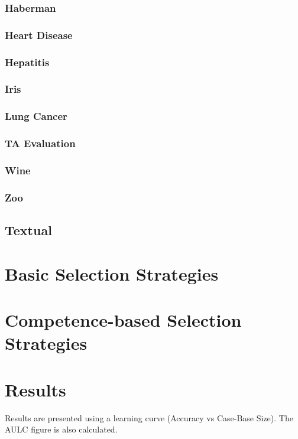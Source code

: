 \documentclass[a4paper,11pt]{report}
\begin{document}
\subsubsection*{Haberman}\label{sec:haberman}
\subsubsection*{Heart Disease}\label{sec:heart_disease}
\subsubsection*{Hepatitis}\label{sec:hepatitis}
\subsubsection*{Iris}\label{sec:iris}
\subsubsection*{Lung Cancer}\label{sec:lung_cancer}
\subsubsection*{TA Evaluation}\label{sec:taevaluation}
\subsubsection*{Wine}\label{sec:wine}
\subsubsection*{Zoo}\label{sec:zoo}
\subsection{Textual}

\section{Basic Selection Strategies}


\section{Competence-based Selection Strategies}

\section{Results}
Results are presented using a learning curve (Accuracy vs Case-Base Size). The AULC figure is also calculated.
\end{document}
